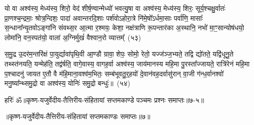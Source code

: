 यो वा अश्व॑स्य॒ मेध्य॑स्य॒ शिरो॒ वेद॑ शीर्\mbox{}ष॒ण्वान्मेध्यो॑ भवत्यु॒षा वा अश्व॑स्य॒ मेध्य॑स्य॒ शिरः॒ सूर्य॒श्चक्षु॒र्वातः॑ प्रा॒णश्च॒न्द्रमाः॒ श्रोत्र॒न्दिशः॒ पादा॑ अवान्तरदि॒शाः पर्\mbox{}श॑वो\-ऽहोरा॒त्रे नि॑मे॒षो᳚\-ऽर्धमा॒साः पर्वा॑णि॒ मासाः᳚ स॒न्धाना᳚न्यृ॒तवो\-ऽङ्गा॑नि संवथ्स॒र आ॒त्मा र॒श्मयः॒ केशा॒ नक्ष॑त्राणि रू॒पन्तार॑का अ॒स्थानि॒ नभो॑ मा॒ꣳ॒सान्योष॑धयो॒ लोमा॑नि॒ वन॒स्पत॑यो॒ वाला॑ अ॒ग्निर्मुखं॑ वैश्वान॒रो व्यात्तम्᳚~(५३)\ip

स॒मु॒द्र उ॒दर॑म॒न्तरि॑क्षं पा॒युर्द्यावा॑\-पृथि॒वी आ॒ण्डौ ग्रावा॒ शेपः॒ सोमो॒ रेतो॒ यज्ज॑ञ्ज॒भ्यते॒ तद्वि द्यो॑तते॒ यद्वि॑धूनु॒ते तथ्स्त॑नयति॒ यन्मेह॑ति॒ तद्व॑र्\mbox{}षति॒ वागे॒वास्य॒ वागह॒र्वा अश्व॑स्य॒ जाय॑मानस्य महि॒मा पु॒रस्ता᳚ज्जायते॒ रात्रि॑रेनं महि॒मा प॒श्चादनु॑ जायत ए॒तौ वै म॑हि॒माना॒वश्व॑म॒भितः॒ सम्ब॑भूवतु॒र्॒\mbox{}हयो॑ दे॒वान॑वह॒दर्वासु॑रान् वा॒जी ग॑न्ध॒र्वानश्वो॑ मनु॒ष्या᳚न्थ्समु॒द्रो वा अश्व॑स्य॒ योनिः॑ समु॒द्रो बन्धुः॑॥~(५४)\ip

{\anuvakamend[{व्यात्त॑मवह॒द्द्वाद॑श च}]}%

{हरिः॑ ॐ}{॥कृष्ण-यजुर्वेदीय-तैत्तिरीय-संहितायां सप्तमकाण्डे पञ्चमः प्रश्नः समाप्तः॥७-५॥}

\centerline{॥कृष्ण-यजुर्वेदीय-तैत्तिरीय-संहितायां सप्तमकाण्डः समाप्तः॥७॥}

\medskip

\centerline{\hyperref[sec:startkanda7]{\closesection}}



\kandaend


